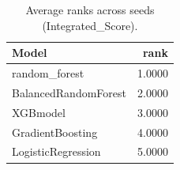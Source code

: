 \begin{table}[t]
\centering
\begin{tabular}{lr}
\toprule
Model & rank \\
\midrule
random_forest & 1.0000 \\
BalancedRandomForest & 2.0000 \\
XGBmodel & 3.0000 \\
GradientBoosting & 4.0000 \\
LogisticRegression & 5.0000 \\
\bottomrule
\end{tabular}
\caption{Average ranks across seeds (Integrated_Score).}
\label{tab:avg_rank_Integrated_Score}
\end{table}